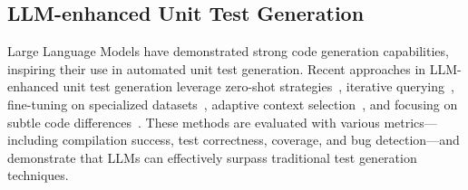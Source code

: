 \subsection{LLM-enhanced Unit Test Generation}

Large Language Models have demonstrated strong code generation capabilities, inspiring their use in automated unit test generation. Recent approaches in LLM-enhanced unit test generation leverage zero-shot strategies~\citep{siddiq2024using}, iterative querying~\citep{schafer2023empirical}, fine-tuning on specialized datasets~\citep{alagarsamy2024enhancing}, adaptive context selection~\citep{xie2023chatunitest}, and focusing on subtle code differences~\citep{dakhel2024effective, li2023nuances}. These methods are evaluated with various metrics—including compilation success, test correctness, coverage, and bug detection—and demonstrate that LLMs can effectively surpass traditional test generation techniques.
